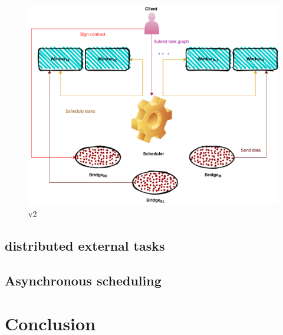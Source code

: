 \begin{figure}[tb]\centering
\includegraphics{figures/ArchiectureDeisaV2.pdf}
\caption{\deisa v2}
\label{figdeidav2}
\end{figure}
\subsection{\dask distributed external tasks}
\subsection{Asynchronous scheduling}
\section{Conclusion}